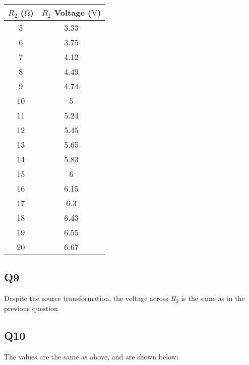 \documentclass[
	letterpaper, %
	10pt, %
]{CSUniSchoolLabReport}
\begin{document}
    \begin{center}
      \begin{tabular}[h!]{| c | c |}
        \hline
        $R_2$ ($\si{\ohm}$) & $R_2$ Voltage ($\si{\volt}$)\\
        \hline
        5 & 3.33\\
        \hline
        6 & 3.75\\
        \hline
        7 & 4.12\\
        \hline
        8 & 4.49\\
        \hline
        9 & 4.74\\
        \hline
        10 & 5\\
        \hline
        11 & 5.24\\
        \hline
        12 & 5.45\\
        \hline
        13 & 5.65\\
        \hline
        14 & 5.83\\
        \hline
        15 & 6\\
        \hline
        16 & 6.15\\
        \hline
        17 & 6.3\\
        \hline
        18 & 6.43\\
        \hline
        19 & 6.55\\
        \hline
        20 & 6.67\\
        \hline
      \end{tabular}
    \end{center}

    \subsection{Q9} Despite the source transformation, the voltage across $R_2$ is the same as in the previous question

    \subsection{Q10} The values are the same as above, and are shown below:

 \begin{center}
    \end{center}
\end{document}
